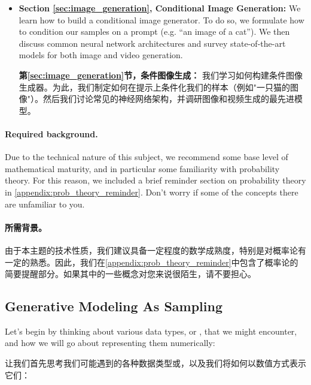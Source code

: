 \begin{itemize}
\item \textbf{\sffamily Section \ref{sec:image_generation}, Conditional Image Generation:} We learn how to build a conditional image generator. To do so, we formulate how to condition our samples on a prompt (e.g. ``an image of a cat''). We then discuss common neural network architectures and survey state-of-the-art models for both image and video generation.

\textbf{\sffamily 第\ref{sec:image_generation}节，条件图像生成：} 我们学习如何构建条件图像生成器。为此，我们制定如何在提示上条件化我们的样本（例如"一只猫的图像"）。然后我们讨论常见的神经网络架构，并调研图像和视频生成的最先进模型。
\end{itemize}

\paragraph{Required background.} Due to the technical nature of this subject, we recommend some base level of mathematical maturity, and in particular some familiarity with probability theory. For this reason, we included a brief reminder section on probability theory in \cref{appendix:prob_theory_reminder}. Don't worry if some of the concepts there are unfamiliar to you.

\paragraph{所需背景。} 由于本主题的技术性质，我们建议具备一定程度的数学成熟度，特别是对概率论有一定的熟悉。因此，我们在\cref{appendix:prob_theory_reminder}中包含了概率论的简要提醒部分。如果其中的一些概念对您来说很陌生，请不要担心。

\subsection{Generative Modeling As Sampling}
\label{subsec:gm_as_sampling}
Let's begin by thinking about various data types, or , that we might encounter, and how we will go about representing them numerically:

让我们首先思考我们可能遇到的各种数据类型或，以及我们将如何以数值方式表示它们：

